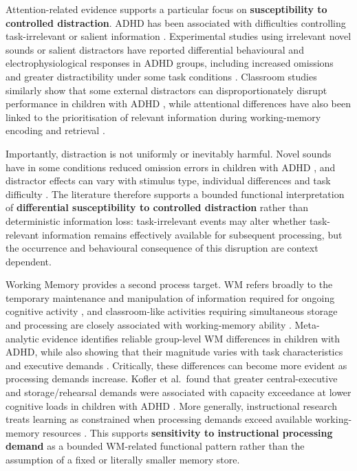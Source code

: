 Attention-related evidence supports a particular focus on \textbf{susceptibility to controlled distraction}. ADHD has been associated with difficulties controlling task-irrelevant or salient information \cite{aboitiz2014irrelevant}. Experimental studies using irrelevant novel sounds or salient distractors have reported differential behavioural and electrophysiological responses in ADHD groups, including increased omissions and greater distractibility under some task conditions \cite{gumenyuk2005electrophysiological,schneidt2018distraction}. Classroom studies similarly show that some external distractors can disproportionately disrupt performance in children with ADHD \cite{pelham-etal-2011-distractors}, while attentional differences have also been linked to the prioritisation of relevant information during working-memory encoding and retrieval \cite{ortega2020neurocognitive}.

Importantly, distraction is not uniformly or inevitably harmful. Novel sounds have in some conditions reduced omission errors in children with ADHD \cite{van2007distraction}, and distractor effects can vary with stimulus type, individual differences and task difficulty \cite{pelham-etal-2011-distractors,schneidt2018distraction}. The literature therefore supports a bounded functional interpretation of \textbf{differential susceptibility to controlled distraction} rather than deterministic information loss: task-irrelevant events may alter whether task-relevant information remains effectively available for subsequent processing, but the occurrence and behavioural consequence of this disruption are context dependent.

Working Memory provides a second process target. WM refers broadly to the temporary maintenance and manipulation of information required for ongoing cognitive activity \cite{baddeley2012working}, and classroom-like activities requiring simultaneous storage and processing are closely associated with working-memory ability \cite{gathercole2008working}. Meta-analytic evidence identifies reliable group-level WM differences in children with ADHD, while also showing that their magnitude varies with task characteristics and executive demands \cite{martinussen2005meta,kasper2012moderators}. Critically, these differences can become more evident as processing demands increase. Kofler et al.~found that greater central-executive and storage/rehearsal demands were associated with capacity exceedance at lower cognitive loads in children with ADHD \cite{kofler2010adhd}. More generally, instructional research treats learning as constrained when processing demands exceed available working-memory resources \cite{sweller-etal-2019-cognitive}. This supports \textbf{sensitivity to instructional processing demand} as a bounded WM-related functional pattern rather than the assumption of a fixed or literally smaller memory store.

